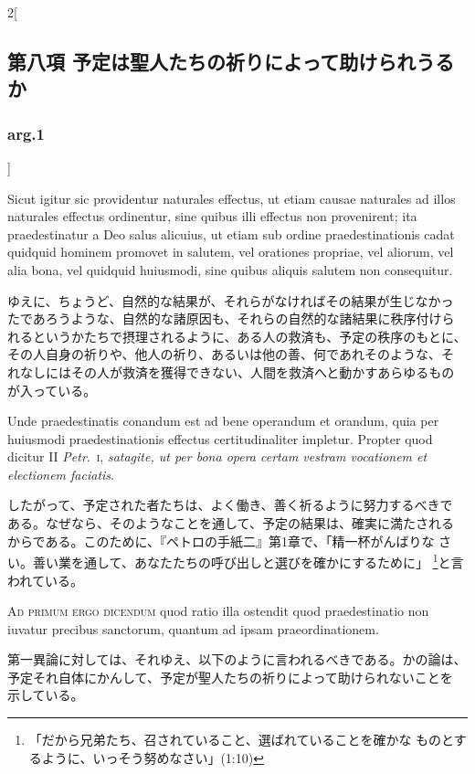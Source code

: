 \documentclass[paper=a4paper,fontsize=10pt,jafontsize=9pt,titlepage]{jlreq}
\begin{document}
\begin{paracol}{2}[\subsection{第八項 予定は聖人たちの祈りによって助けられうるか}\subsubsection{arg.1}]
\switchcolumn*


Sicut igitur sic providentur
naturales effectus, ut etiam causae naturales ad illos naturales
effectus ordinentur, sine quibus illi effectus non provenirent; ita
praedestinatur a Deo salus alicuius, ut etiam sub ordine
praedestinationis cadat quidquid hominem promovet in salutem, vel
orationes propriae, vel aliorum, vel alia bona, vel quidquid huiusmodi,
sine quibus aliquis salutem non consequitur.


\switchcolumn


ゆえに、ちょうど、自然的な結果が、それらがなければその結果が生じなかっ
たであろうような、自然的な諸原因も、それらの自然的な諸結果に秩序付けら
れるというかたちで摂理されるように、ある人の救済も、予定の秩序のもとに、
その人自身の祈りや、他人の祈り、あるいは他の善、何であれそのような、そ
れなしにはその人が救済を獲得できない、人間を救済へと動かすあらゆるもの
が入っている。


\switchcolumn*


Unde praedestinatis
conandum est ad bene operandum et orandum, quia per huiusmodi
praedestinationis effectus certitudinaliter impletur. Propter quod
dicitur II {\itshape Petr}.~{\scshape i}, {\itshape satagite, ut per bona opera certam vestram
vocationem et electionem faciatis}.


\switchcolumn


したがって、予定された者たちは、よく働き、善く祈るように努力するべきで
ある。なぜなら、そのようなことを通して、予定の結果は、確実に満たされる
からである。このために、『ペトロの手紙二』第1章で、「精一杯がんばりな
さい。善い業を通して、あなたたちの呼び出しと選びを確かにするために」
\footnote{「だから兄弟たち、召されていること、選ばれていることを確かな
ものとするように、いっそう努めなさい」(1:10)}と言われている。


\switchcolumn*[\subsubsection{ad.1}]


{\scshape Ad primum ergo dicendum} quod ratio illa
ostendit quod praedestinatio non iuvatur precibus sanctorum, quantum ad
ipsam praeordinationem.


\switchcolumn


第一異論に対しては、それゆえ、以下のように言われるべきである。かの論は、
予定それ自体にかんして、予定が聖人たちの祈りによって助けられないことを
示している。


\switchcolumn*[\subsubsection{ad.2}]



\end{paracol}
\end{document}

